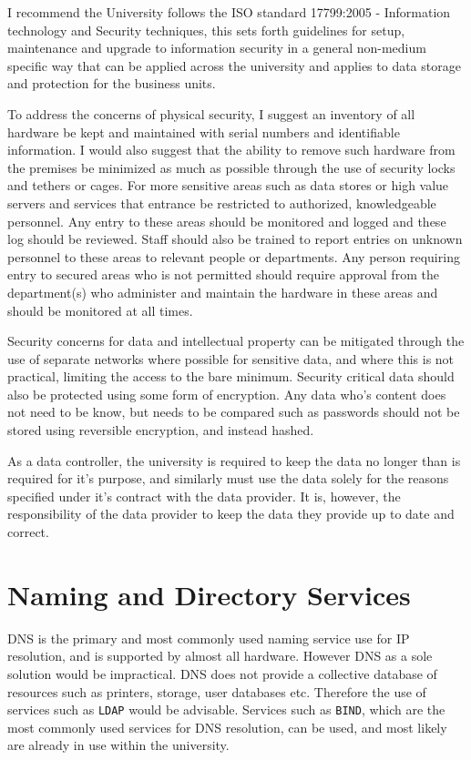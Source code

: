 \documentclass[10pt]{article}
\begin{document}
        I recommend the University follows the ISO standard 17799:2005 - Information technology and Security techniques\cite{cite:iso17799:2005}, this sets forth guidelines for setup, maintenance and upgrade to information security in a general non-medium specific way that can be applied across the university and applies to data storage and protection for the business units.

        To address the concerns of physical security, I suggest an inventory of all hardware be kept and maintained with serial numbers and identifiable information. I would also suggest that the ability to remove such hardware from the premises be minimized as much as possible through the use of security locks and tethers or cages. For more sensitive areas such as data stores or high value servers and services that entrance be restricted to authorized, knowledgeable personnel. Any entry to these areas should be monitored and logged and these log should be reviewed. Staff should also be trained to report entries on unknown personnel to these areas to relevant people or departments. Any person requiring entry to secured areas who is not permitted should require approval from the department(s) who administer and maintain the hardware in these areas and should be monitored at all times. 

        Security concerns for data and intellectual property can be mitigated through the use of separate networks where possible for sensitive data, and where this is not practical, limiting the access to the bare minimum. Security critical data should also be protected using some form of encryption. Any data who's content does not need to be know, but needs to be compared such as passwords should not be stored using reversible encryption, and instead hashed.

        As a data controller, the university is required to keep the data no longer than is required for it's purpose, and similarly must use the data solely for the reasons specified under it's contract with the data provider. It is, however, the responsibility of the data provider to keep the data they provide up to date and correct. 

    \section{Naming and Directory Services}
        DNS is the primary and most commonly used naming service use for IP resolution, and is supported by almost all hardware. However DNS as a sole solution would be impractical. DNS does not provide a collective database of resources such as printers, storage, user databases etc. Therefore the use of services such as \texttt{LDAP} would be advisable\cite{cite:ldap}. Services such as \texttt{BIND}, which are the most commonly used services for DNS resolution, can be used, and most likely are already in use within the university\cite{cite:bind}.
\end{document}
